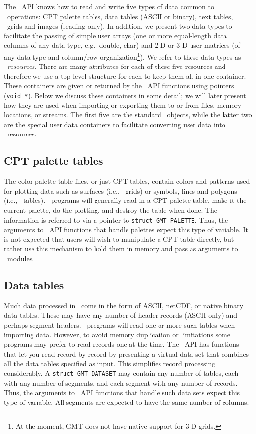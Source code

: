 \documentclass[11pt]{report}
\begin{document}
The \GMT\ API knows how to read and write five types of data common to \GMT\ operations:
CPT palette tables, data tables (ASCII or binary), text tables, \GMT\ grids and images (reading only).
In addition, we present two data types to facilitate the passing of simple user arrays (one or more equal-length data columns
of any data type, e.g., double, char) and 2-D or 3-D user matrices (of any data type and column/row
organization\footnote{At the moment, GMT does not have native support for 3-D grids.}). We
refer to these data types as \GMT\ \emph{resources}.
There are many attributes for each of these five resources and therefore we use a top-level structure for each
to keep them all in one container.  These containers are given or returned by the \GMT\ API
functions using pointers (\texttt{void *}).  Below we discuss these containers in some detail; we
will later present how they are used when importing or exporting them to or from files,
memory locations, or streams.  The first five are the standard \GMT\ objects, while the latter two are the
special user data containers to facilitate converting user data into \GMT\ resources.

\subsection{CPT palette tables}

The color palette table files, or just CPT tables, contain colors and patterns used for plotting
data such as surfaces (i.e., \GMT\ grids) or symbols, lines and polygons (i.e., \GMT\ tables).
\GMT\ programs will generally read in a CPT
palette table, make it the current palette, do the plotting, and destroy the table when done.
The information is referred to via a pointer to \texttt{struct GMT\_PALETTE}.  Thus, the
arguments to \GMT\ API functions that handle palettes expect this type of variable. It is not expected
that users will wish to manipulate a CPT table directly, but rather use this mechanism to hold them
in memory and pass as arguments to \GMT\ modules.

\subsection{Data tables}

Much data processed in \GMT\ come in the form of ASCII, netCDF, or native binary data tables.  These may
have any number of header records (ASCII only) and perhaps segment headers.  \GMT\ programs will
read one or more such tables when importing data.  However, to avoid memory duplication or limitations
some programs may prefer to read
records one at the time.  The \GMT\ API has functions that let you read record-by-record
by presenting a virtual data set that combines all the data tables specified as input.
This simplifies record processing considerably.  A \texttt{struct GMT\_DATASET} may contain
any number of tables, each with any number of segments, and each segment with any number of records.   Thus, the
arguments to \GMT\ API functions that handle such data sets expect this type of variable.  All segments
are expected to have the same number of columns.
\end{document}
